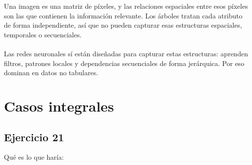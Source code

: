 \documentclass[a4paper,12pt]{article}
\begin{document}
            Una imagen es una matriz de píxeles, y las relaciones espaciales entre esos píxeles son las que contienen la información relevante. Los árboles tratan cada atributo de forma independiente, así que no pueden capturar esas estructuras espaciales, temporales o secuenciales. \\
            \\
            \noindent Las redes neuronales sí están diseñadas para capturar estas estructuras: aprenden filtros, patrones locales y dependencias secuenciales de forma jerárquica. Por eso dominan en datos no tabulares.
    \section*{Casos integrales}
        \subsection*{Ejercicio 21}
           \noindent Qué es lo que haría:
\end{document}
